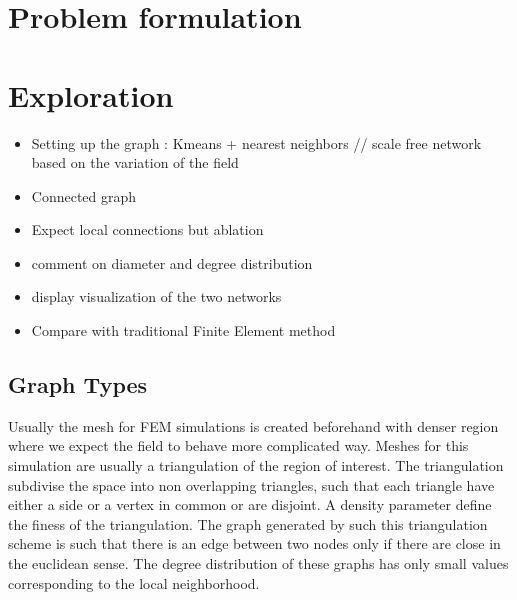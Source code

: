 \documentclass[a4paper,10pt]{article}
\begin{document}
\section{Problem formulation}

\section{Exploration}

\begin{itemize}
  \item Setting up the graph : Kmeans + nearest neighbors // scale free network based on the variation of the field
  \item Connected graph
  \item Expect local connections but ablation
  \item comment on diameter and degree distribution
  \item display visualization of the two networks
  \item Compare with traditional Finite Element method
\end{itemize}

\subsection{Graph Types}

Usually the mesh for FEM simulations is created beforehand with denser region where we expect the field to behave more complicated way. Meshes for this simulation are usually a triangulation of the region of interest. The triangulation subdivise the space into non overlapping triangles, such that each triangle have either a side or a vertex in common or are disjoint. A density parameter define the finess of the triangulation. The graph generated by such this triangulation scheme is such that there is an edge between two nodes only if there are close in the euclidean sense. The degree distribution of these graphs has only small values corresponding to the local neighborhood.
\end{document}

